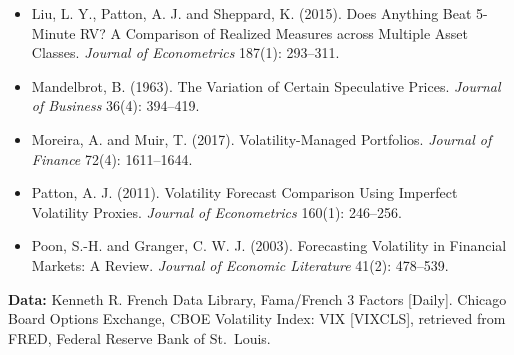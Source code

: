 \begin{itemize}
  \item Liu, L. Y., Patton, A. J. and Sheppard, K. (2015). Does Anything Beat 5-Minute RV? A Comparison of Realized Measures across Multiple Asset Classes. \emph{Journal of Econometrics} 187(1): 293--311.
  \item Mandelbrot, B. (1963). The Variation of Certain Speculative Prices. \emph{Journal of Business} 36(4): 394--419.
  \item Moreira, A. and Muir, T. (2017). Volatility-Managed Portfolios. \emph{Journal of Finance} 72(4): 1611--1644.
  \item Patton, A. J. (2011). Volatility Forecast Comparison Using Imperfect Volatility Proxies. \emph{Journal of Econometrics} 160(1): 246--256.
  \item Poon, S.-H. and Granger, C. W. J. (2003). Forecasting Volatility in Financial Markets: A Review. \emph{Journal of Economic Literature} 41(2): 478--539.
\end{itemize}

\textbf{Data:} Kenneth R. French Data Library, Fama/French 3 Factors [Daily]. Chicago Board Options Exchange, CBOE Volatility Index: VIX [VIXCLS], retrieved from FRED, Federal Reserve Bank of St.\ Louis.
